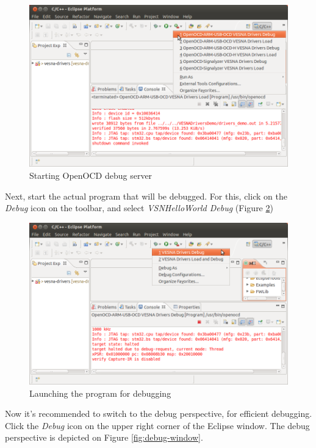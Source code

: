 \documentclass[a4paper, 10pt]{article}
\begin{document}
    \begin{figure}[H]
    \centering
        \includegraphics[width=\textwidth]{./install-guide-linux-images/debug-openocd-start.png}
        \caption{Starting OpenOCD debug server}
        \label{fig:debug-openocd-start}
    \end{figure}

Next, start the actual program that will be debugged.
For this, click on the \emph{Debug} icon on the toolbar, and select
\emph{VSNHelloWorld Debug}
(Figure \ref{fig:debug-launch})

    \begin{figure}[H]
    \centering
        \includegraphics[width=\textwidth]{./install-guide-linux-images/debug-launch.png}
        \caption{Launching the program for debugging}
        \label{fig:debug-launch}
    \end{figure}

Now it's recommended to switch to the debug perspective,
for efficient debugging.
Click the \emph{Debug} icon on the upper right corner of the Eclipse window.
The debug perspective is depicted on Figure \ref{fig:debug-window}.
\end{document}
